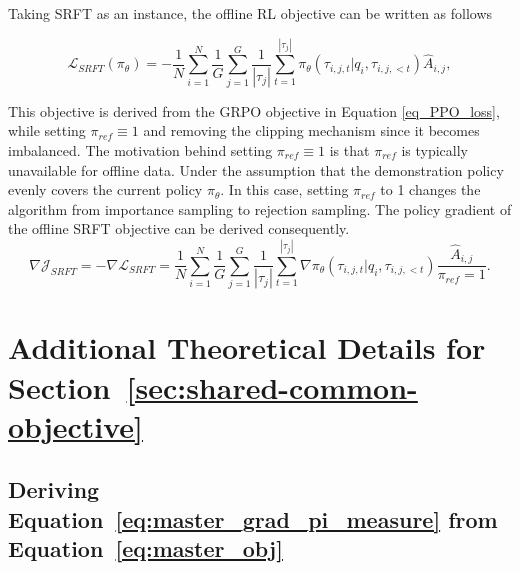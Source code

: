 \documentclass{article} %
\newcommand{\0}{\mathbb{0}}
\newcommand{\1}{\mathbb{1}}
\newcommand{\cL}{\mathcal{L}}
\begin{document}
Taking SRFT \citep{fu2025srft} as an instance, the offline RL objective can be written as follows

\begin{equation}\label{eq_SRFT_loss}
    \cL_{SRFT}(\pi_\theta) = 
    - \frac{1}{N}\sum_{i=1}^N \frac{1}{G}\sum_{j=1}^G \frac{1}{|\tau_j|} \sum_{t=1}^{|\tau_j|} 
        \pi_\theta (\tau_{i,j,t} |q_i, \tau_{i,j, <t} )  \hat{A}_{i,j},
\end{equation}

This objective is derived from the GRPO objective in Equation \eqref{eq_PPO_loss}, while setting $\pi_{ref} \equiv 1$ and removing the clipping mechanism since it becomes imbalanced.
The motivation behind setting $\pi_{ref} \equiv 1$ is that $\pi_{ref}$ is typically unavailable for offline data. Under the assumption that the demonstration policy evenly covers the current policy $\pi_\theta$. In this case, setting $\pi_{ref}$ to 1 changes the algorithm from importance sampling to rejection sampling.
The policy gradient of the offline SRFT objective can be derived consequently.
\begin{equation}\label{eq_SRFT_grad}
    \nabla \mathcal{J}_{SRFT} = -\nabla \cL_{SRFT} =     \frac{1}{N}\sum_{i=1}^N \frac{1}{G}\sum_{j=1}^G \frac{1}{|\tau_j|} \sum_{t=1}^{|\tau_j|} 
    \nabla \pi_\theta (\tau_{i,j,t} |q_i, \tau_{i,j, <t} )  \frac{\hat{A}_{i,j} }{\pi_{ref} = 1} .
\end{equation}




\section{Additional Theoretical Details for Section~\ref{sec:shared-common-objective}}
\label{app:theory-details}

\newtheorem{propositionA}{Proposition}
\renewcommand{\thepropositionA}{A\arabic{propositionA}}
\newtheorem{theoremA}{Theorem}
\renewcommand{\thetheoremA}{A\arabic{theoremA}}
\newtheorem{lemmaA}{Lemma}
\renewcommand{\thelemmaA}{A\arabic{lemmaA}}
\newtheorem{corollaryA}{Corollary}
\renewcommand{\thecorollaryA}{A\arabic{corollaryA}}
\newtheorem{remarkA}{Remark}
\renewcommand{\theremarkA}{A\arabic{remarkA}}

\subsection{Deriving Equation~\ref{eq:master_grad_pi_measure} from Equation~\ref{eq:master_obj}}
\label{app:derivation}
\end{document}
